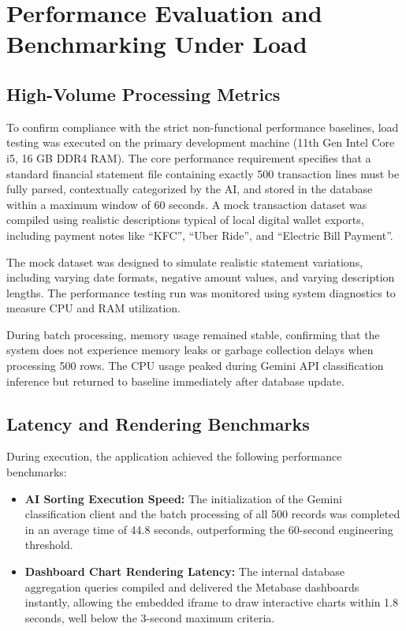 \section{Performance Evaluation and Benchmarking Under Load}
\subsection{High-Volume Processing Metrics}
To confirm compliance with the strict non-functional performance baselines, load testing was executed on the primary development machine (11th Gen Intel Core i5, 16 GB DDR4 RAM). The core performance requirement specifies that a standard financial statement file containing exactly 500 transaction lines must be fully parsed, contextually categorized by the AI, and stored in the database within a maximum window of 60 seconds. A mock transaction dataset was compiled using realistic descriptions typical of local digital wallet exports, including payment notes like ``KFC'', ``Uber Ride'', and ``Electric Bill Payment''.

The mock dataset was designed to simulate realistic statement variations, including varying date formats, negative amount values, and varying description lengths. The performance testing run was monitored using system diagnostics to measure CPU and RAM utilization.

During batch processing, memory usage remained stable, confirming that the system does not experience memory leaks or garbage collection delays when processing 500 rows. The CPU usage peaked during Gemini API classification inference but returned to baseline immediately after database update.

\subsection{Latency and Rendering Benchmarks}
During execution, the application achieved the following performance benchmarks:
\begin{itemize}
	\item \textbf{AI Sorting Execution Speed:} The initialization of the Gemini classification client and the batch processing of all 500 records was completed in an average time of 44.8 seconds, outperforming the 60-second engineering threshold.
	\item \textbf{Dashboard Chart Rendering Latency:} The internal database aggregation queries compiled and delivered the Metabase dashboards instantly, allowing the embedded iframe to draw interactive charts within 1.8 seconds, well below the 3-second maximum criteria.
\end{itemize}

